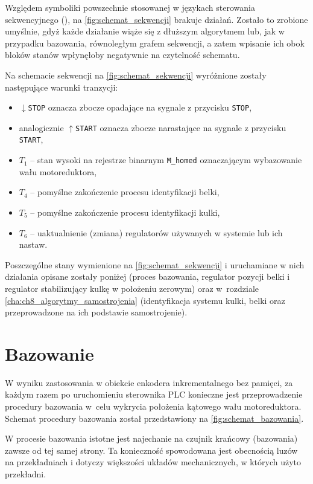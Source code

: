 Względem symboliki powszechnie stosowanej w językach sterowania sekwencyjnego (\cite{SEKW1}\cite{SEKW2}), na \cref{fig:schemat_sekwencji} brakuje działań. Zostało to zrobione umyślnie, gdyż każde działanie wiąże się z dłuższym algorytmem lub, jak w przypadku bazowania, równoległym grafem sekwencji, a zatem wpisanie ich obok bloków stanów wpłynęłoby negatywnie na czytelność schematu.

Na schemacie sekwencji na \cref{fig:schemat_sekwencji} wyróżnione zostały następujące warunki tranzycji:
\begin{itemize}
    \item $\downarrow$\texttt{STOP} oznacza zbocze opadające na sygnale z przycisku \texttt{STOP},
    \item analogicznie $\uparrow$\texttt{START} oznacza zbocze narastające na sygnale z przycisku \texttt{START},
    \item $T_1$ -- stan wysoki na rejestrze binarnym \texttt{M\_homed} oznaczającym wybazowanie wału motoreduktora,
    \item $T_4$ -- pomyślne zakończenie procesu identyfikacji belki,
    \item $T_5$ -- pomyślne zakończenie procesu identyfikacji kulki,
    \item $T_6$ -- uaktualnienie (zmiana) regulatorów używanych w systemie lub ich nastaw.
\end{itemize}

Poszczególne stany wymienione na \cref{fig:schemat_sekwencji} i uruchamiane w nich działania opisane zostały poniżej (proces bazowania, regulator pozycji belki i regulator stabilizujący kulkę w położeniu zerowym) oraz w~rozdziale \ref{cha:ch8_algorytmy_samostrojenia} (identyfikacja systemu kulki, belki oraz przeprowadzone na ich podstawie samostrojenie).

\section{Bazowanie}
\label{sec:ch7_bazowanie}

W wyniku zastosowania w obiekcie enkodera inkrementalnego bez pamięci, za każdym razem po uruchomieniu sterownika PLC konieczne jest przeprowadzenie procedury bazowania w~celu wykrycia położenia kątowego wału motoreduktora. Schemat procedury bazowania został przedstawiony na \cref{fig:schemat_bazowania}.

W procesie bazowania istotne jest najechanie na czujnik krańcowy (bazowania) zawsze od tej samej strony. Ta konieczność spowodowana jest obecnością luzów na przekładniach i dotyczy większości układów mechanicznych, w których użyto przekładni.

